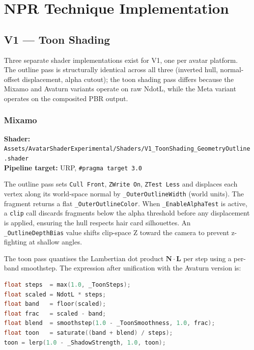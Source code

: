 \section{NPR Technique Implementation}
\label{sec:impl_techniques}

\subsection{V1 — Toon Shading}
\label{sec:impl_v1}

Three separate shader implementations exist for V1, one per avatar platform. The outline pass is structurally identical across all three (inverted hull, normal-offset displacement, alpha cutout); the toon shading pass differs because the Mixamo and Avaturn variants operate on raw NdotL, while the Meta variant operates on the composited PBR output.

\subsubsection{Mixamo}
\label{sec:impl_v1_mixamo}

\textbf{Shader:} \texttt{Assets/AvatarShaderExperimental/Shaders/V1\_ToonShading\_GeometryOutline.shader} \\
\textbf{Pipeline target:} URP, \texttt{\#pragma target 3.0}

The outline pass sets \texttt{Cull Front}, \texttt{ZWrite On}, \texttt{ZTest Less} and displaces each vertex along its world-space normal by \texttt{\_OuterOutlineWidth} (world units). The fragment returns a flat \texttt{\_OuterOutlineColor}. When \texttt{\_EnableAlphaTest} is active, a \texttt{clip} call discards fragments below the alpha threshold before any displacement is applied, ensuring the hull respects hair card silhouettes. An \texttt{\_OutlineDepthBias} value shifts clip-space Z toward the camera to prevent z-fighting at shallow angles.

The toon pass quantises the Lambertian dot product $\mathbf{N} \cdot \mathbf{L}$ per step using a per-band smoothstep. The expression after unification with the Avaturn version is:

\begin{lstlisting}[language=C, style=mystyle, caption={V1 toon quantisation — Mixamo and Avaturn (unified).}]
float steps  = max(1.0, _ToonSteps);
float scaled = NdotL * steps;
float band   = floor(scaled);
float frac   = scaled - band;
float blend  = smoothstep(1.0 - _ToonSmoothness, 1.0, frac);
float toon   = saturate((band + blend) / steps);
toon = lerp(1.0 - _ShadowStrength, 1.0, toon);
\end{lstlisting}

